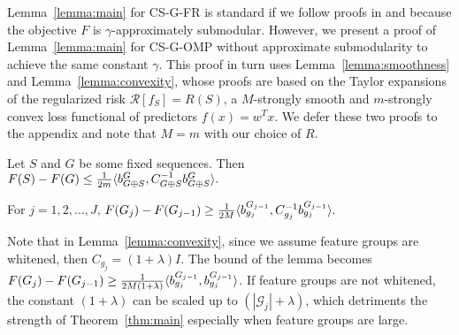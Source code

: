 


Lemma~\ref{lemma:main} for CS-G-FR is standard if we follow proofs in \citep{streeter:08} and \citep{kemp} because the objective $F$ is $\gamma$-approximately submodular. 
However, we present a proof of 
Lemma~\ref{lemma:main} for CS-G-OMP without approximate submodularity to achieve the same constant $\gamma$. 
This proof in turn uses Lemma~\ref{lemma:smoothness} and Lemma~\ref{lemma:convexity}, whose proofs are based on the Taylor expansions of the regularized risk $\mathcal{R}[f_S]=R(S)$, a $M$-strongly smooth and $m$-strongly convex loss functional of predictors $f(x) = w^T x$.
We defer these two proofs to the appendix and note that 
$M=m$ with our choice of $R$. 



\begin{lemma}
  Let $S$ and $G$ be some fixed sequences. Then
  \mbox{$
    F(S) - F(G) \leq \frac{1}{2m} \langle b^G_{G \oplus S}, C_{G \oplus S}^{-1} b^G_{G\oplus S} \rangle.
  $}
  \label{lemma:smoothness}
\end{lemma}

\begin{lemma} For $j = 1,2,..., J$, 
    \mbox{$
      F(G_j) - F(G_{j-1}) \geq \frac{1}{2M} \langle  {b^{G_{j-1}}_{g_j}}, C_{g_j}^{-1}b^{G_{j-1}}_{g_j}  \rangle.
    $}
  \label{lemma:convexity}
\end{lemma}
Note that in Lemma~\ref{lemma:convexity}, since we assume feature groups are 
whitened, then $C_{g_j} = (1+\lambda) I$. The bound of the lemma becomes
$F(G_j) - F(G_{j-1}) \geq \frac{1}{2M (1+\lambda)} \langle  {b^{G_{j-1}}_{g_j}}, b^{G_{j-1}}_{g_j}  \rangle$. If feature groups are not whitened, 
the constant $(1+\lambda)$ can be scaled up to $(|\mathcal{G}_j| + \lambda)$, 
which detriments the strength of Theorem~\ref{thm:main} especially when feature 
groups are large. 


